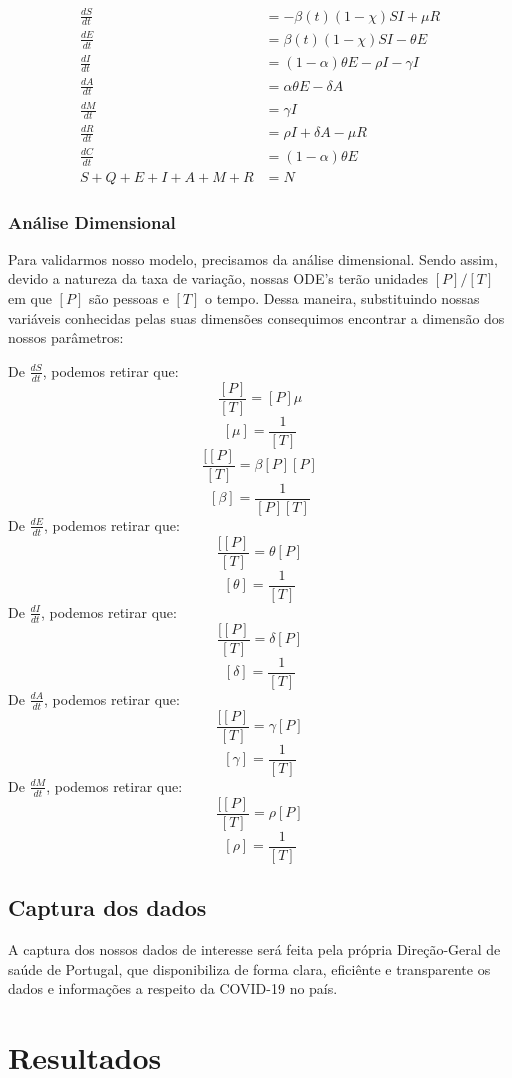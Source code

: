 \documentclass[12pt]{article}
\begin{document}
\begin{align*}
  \frac{dS}{dt} &= -\beta(t)(1-\chi)SI + \mu R   \\
 \frac{dE}{dt} &= \beta(t)(1-\chi)SI - \theta E    \\
 \frac{dI}{dt} &= (1-\alpha)\theta E - \rho I - \gamma I   \\
 \frac{dA}{dt} &= \alpha \theta E - \delta A \\
 \frac{dM}{dt} &= \gamma I \\
 \frac{dR}{dt} &= \rho I + \delta A - \mu R \\
 \frac{dC}{dt} &= (1-\alpha) \theta E \\
 S + Q + E + I + A + M + R & = N
\end{align*}
\subsubsection{Análise Dimensional}

Para validarmos nosso modelo, precisamos da análise dimensional. Sendo assim, devido a natureza da taxa de variação, nossas ODE's terão unidades $[P]/[T]$ em que $[P]$ são pessoas e $[T]$ o tempo. Dessa maneira, substituindo nossas variáveis conhecidas pelas suas dimensões consequimos encontrar a dimensão dos nossos parâmetros:

\newline
De $\frac{dS}{dt}$, podemos retirar que: 
\[ \frac{[P]}{[T]} = [P] \mu \]
\[ [\mu] =\frac{1}{[T]} \] 
\[ \frac{[[P]}{[T]} = \beta[P][P] \]
\[ [\beta] = \frac{1}{[P][T]} \]
De $\frac{dE}{dt}$, podemos retirar que:
\[ \frac{[[P]}{[T]} = \theta[P] \]
\[ [\theta] = \frac{1}{[T]} \]
De $\frac{dI}{dt}$, podemos retirar que:
\[ \frac{[[P]}{[T]} = \delta[P] \]
\[ [\delta] = \frac{1}{[T]} \]
De $\frac{dA}{dt}$, podemos retirar que:
\[ \frac{[[P]}{[T]} = \gamma[P] \]
\[ [\gamma] = \frac{1}{[T]} \]
De $\frac{dM}{dt}$, podemos retirar que:
\[ \frac{[[P]}{[T]} = \rho[P] \]
\[ [\rho] = \frac{1}{[T]} \]

\subsection{Captura dos dados}

A captura dos nossos dados de interesse será feita pela própria Direção-Geral de saúde de Portugal, que disponibiliza de forma clara, eficiênte e transparente os dados e informações a respeito da COVID-19 no país.

{\large \section{Resultados} }
\end{document}
